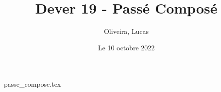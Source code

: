 \documentclass{article}
\title{Dever 19 - Passé Composé}
\author{Oliveira, Lucas}
\date{Le 10 octobre 2022}
\begin{document}
    \maketitle

    {passe_compose.tex}
    
\end{document}
